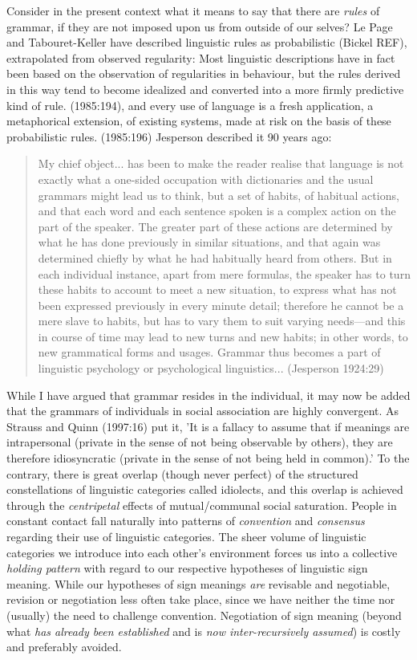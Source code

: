 Consider in the present context what it means to say that there are \textit{rules }of grammar, if they are not imposed upon us from outside of our selves? Le Page and Tabouret-Keller have described linguistic rules as probabilistic (Bickel REF), extrapolated from observed regularity: Most linguistic descriptions have in fact been based on the observation of regularities in behaviour, but the rules derived in this way tend to become idealized and converted into a more firmly predictive kind of rule. (1985:194), and every use of language is a fresh application, a metaphorical extension, of existing systems, made at risk on the basis of these probabilistic rules. (1985:196) Jesperson described it 90 years ago:

\begin{quotation}
	My chief object... has been to make the reader realise that language is not exactly what a one-sided occupation with dictionaries and the usual grammars might lead us to think, but a set of habits, of habitual actions, and that each word and each sentence spoken is a complex action on the part of the speaker. The greater part of these actions are determined by what he has done previously in similar situations, and that again was determined chiefly by what he had habitually heard from others. But in each individual instance, apart from mere formulas, the speaker has to turn these habits to account to meet a new situation, to express what has not been expressed previously in every minute detail; therefore he cannot be a mere slave to habits, but has to vary them to suit varying needs---and this in course of time may lead to new turns and new habits; in other words, to new grammatical forms and usages. Grammar thus becomes a part of linguistic psychology or psychological linguistics...  (Jesperson 1924:29)
\end{quotation}



	While I have argued that grammar resides in the individual, it may now be added that the grammars of individuals in social association are highly convergent. As Strauss and Quinn (1997:16) put it, 'It is a fallacy to assume that if meanings are intrapersonal (private in the sense of not being observable by others), they are therefore idiosyncratic (private in the sense of not being held in common).' To the contrary, there is great overlap (though never perfect) of the structured constellations of linguistic categories called idiolects, and this overlap is achieved through the \textit{centripetal} effects of mutual/communal social saturation. People in constant contact fall naturally into patterns of \textit{convention }and \textit{consensus} regarding their use of linguistic categories. The sheer volume of linguistic categories we introduce into each other's environment forces us into a collective \textit{holding pattern }with regard to our respective hypotheses of linguistic sign meaning. While our hypotheses of sign meanings \textit{are} revisable and negotiable, revision or negotiation less often take place, since we have neither the time nor (usually) the need to challenge convention. Negotiation of sign meaning (beyond what \textit{has already been established} and is \textit{now inter-recursively assumed}) is costly and preferably avoided. 


